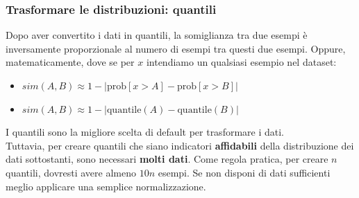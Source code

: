\begin{frame}
	
	\frametitle{{\color{GradientDescentDiagramOrange}Trasformare le distribuzioni}: {\color{GradientDescentDiagramGreen}quantili}}
		
		Dopo aver convertito i dati in quantili, la somiglianza tra due esempi è inversamente proporzionale al numero di esempi tra questi due esempi.
		\newlinedouble
		Oppure, matematicamente, dove se per $x$ intendiamo un qualsiasi esempio nel dataset: 
		\begin{itemize}
			\item $sim(A,B) \approx 1 - | \text{prob}[x > A] - \text{prob}[x > B] |$
			\item $sim(A,B) \approx 1 - | \text{quantile}(A) - \text{quantile}(B) |$
		\end{itemize}
		
		 I quantili sono la migliore scelta di default per trasformare i dati.\\
		 Tuttavia, per creare quantili che siano indicatori \textbf{affidabili} della distribuzione dei dati sottostanti, sono necessari \textbf{molti dati}.
		 \newlinedouble
		 Come regola pratica, per creare $n$ quantili, dovresti avere almeno $10n$ esempi. Se non disponi di dati sufficienti meglio applicare una semplice normalizzazione.
	
\end{frame}
